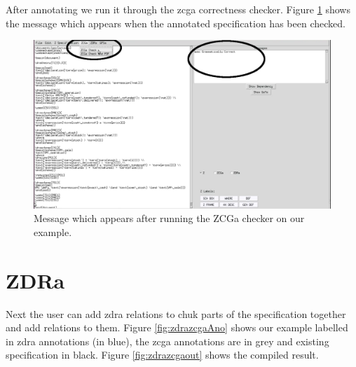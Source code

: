 After annotating we run it through the \gls{zcga} correctness checker. Figure \ref{fig:zcgacorrect} shows the message which appears when the annotated specification has been checked. 

\begin{figure}[H]
\centering
\includegraphics[scale=0.3]{Figures/fullexample/zcgacorrect.png}
\caption{Message which appears after running the ZCGa checker on our example. \label{fig:zcgacorrect}}
\end{figure}

\section{ZDRa}

Next the user can add \gls{zdra} relations to chuk parts of the specification together and add relations to them. Figure \ref{fig:zdrazcgaAno} shows our example labelled in \gls{zdra} annotations (in blue), the \gls{zcga} annotations are in grey and existing specification in black. Figure \ref{fig:zdrazcgaout} shows the compiled result.

